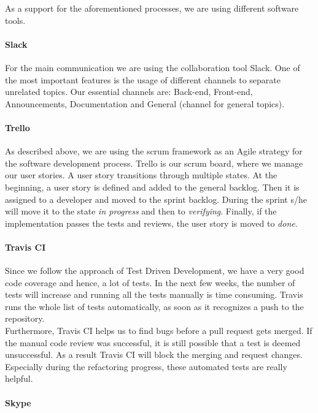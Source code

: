 \documentclass[10pt]{scrartcl}
\begin{document}
As a support for the aforementioned processes, we are using different software tools.

\paragraph{Slack}

For the main communication we are using the collaboration tool Slack. One of the most important features is the usage of different channels to separate unrelated topics. Our essential channels are: Back-end, Front-end, Announcements, Documentation and General (channel for general topics).

\paragraph{Trello}

As described above, we are using the scrum framework as an Agile strategy for the software development process. Trello is our scrum board, where we manage our user stories. A user story transitions through multiple states. At the beginning, a user story is defined and added to the general backlog. Then it is assigned to a developer and moved to the sprint backlog. During the sprint s/he will move it to the state \textit{in progress} and then to \textit{verifying}. Finally, if the implementation passes the tests and reviews, the user story is moved to \textit{done}.

\paragraph{Travis CI}

Since we follow the approach of Test Driven Development, we have a very good code coverage and hence, a lot of tests. In the next few weeks, the number of tests will increase and running all the tests manually is time consuming. Travis runs the whole list of tests automatically, as soon as it recognizes a push to the repository. 
\\
Furthermore, Travis CI helps us to find bugs before a pull request gets merged. If the manual code review was successful, it is still possible that a test is deemed unsuccessful. As a result Travis CI will block the merging and request changes. Especially during the refactoring progress, these automated tests are really helpful. 

\paragraph{Skype}
\end{document}
